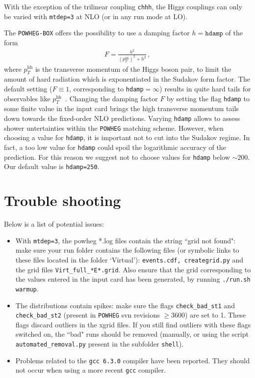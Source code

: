 \documentclass[paper]{JHEP3}
\newcommand\POWHEG{{\tt POWHEG}}
\newcommand\POWHEGBOX{{\tt POWHEG-BOX}}
\newcommand\pthh{\ensuremath{p_{T}^{\mathrm{hh}}}\xspace}
\begin{document}
With the exception of the trilinear coupling {\tt chhh}, the Higgs couplings can only be varied with {\tt mtdep=3} at NLO (or in any run mode at LO).

The \POWHEGBOX{} offers the possibility to use a damping factor $h=\texttt{hdamp}$ of the
form~\cite{Alioli:2008tz,Alioli:2009je}
\begin{align}
  F=\frac{h^{2}}{(\pthh)^2+h^{2}}\,,
\end{align}
where \pthh is the transverse momentum of the Higgs boson pair, to
limit the amount of hard radiation which is exponentiated in the
Sudakov form factor. The default setting ($F\equiv1$, corresponding to {\tt hdamp}$=\infty$) results in
quite hard tails for observables like
$\pthh$~\cite{Heinrich:2017kxx}. Changing the damping factor $F$ by
setting the flag {\tt hdamp} to some finite value in the input
card brings the high transverse momentum tails down towards the fixed-order NLO
predictions. Varying {\tt hdamp} allows to assess shower untertainties
within the \POWHEG{} matching scheme. However, when choosing a value
for {\tt hdamp}, it is important not to cut into the Sudakov
regime. In fact, a too low value for {\tt hdamp} could spoil the
logarithmic accuracy of the prediction. For this reason we suggest not
to choose values for {\tt hdamp} below $\sim 200$. Our default value is  {\tt hdamp=250}.

\section{Trouble shooting}

Below is a list of potential issues:

\begin{itemize}
\item With {\tt mtdep=3}, the powheg *.log files contain the string ``grid not found": make sure your run folder contains the following files 
(or symbolic links to these files located in the folder `Virtual'): {\tt events.cdf, creategrid.py} and the grid files  {\tt Virt\_full\_*E*.grid}. Also ensure that the grid corresponding to the values entered in the input card has been generated, by running {\tt ./run.sh warmup}.
\item The distributions contain spikes: make sure the flags {\tt check\_bad\_st1} and {\tt check\_bad\_st2} (present in \POWHEG{} svn revisions $\geq 3600$) are set to 1. These flags discard outliers in the xgrid files. If you still find outliers with these flags switched on, the ``bad" runs should be removed 
(manually, or using the script {\tt automated\_removal.py} present in the subfolder {\tt shell}).
\item Problems related to the {\tt gcc 6.3.0} compiler have been reported. They should not occur when using a more recent {\tt gcc} compiler.
\end{itemize}
\end{document}
